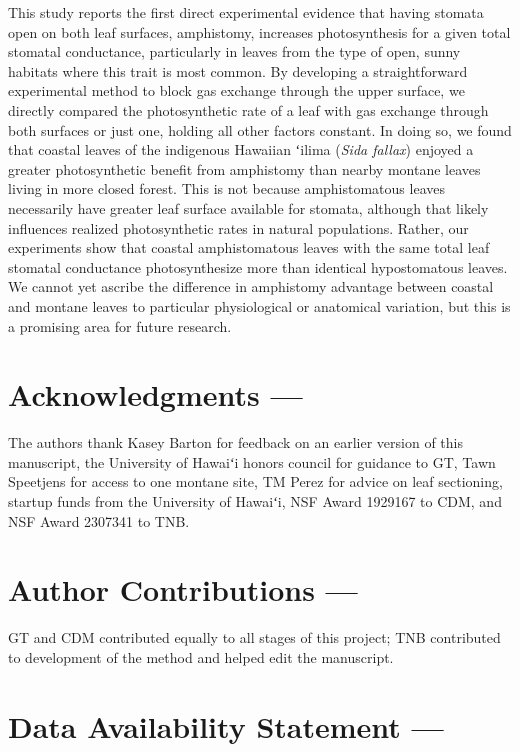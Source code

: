 \documentclass[
  letterpaper,
  DIV=11,
  numbers=noendperiod]{scrartcl}
\begin{document}
This study reports the first direct experimental evidence that having
stomata open on both leaf surfaces, amphistomy, increases photosynthesis
for a given total stomatal conductance, particularly in leaves from the
type of open, sunny habitats where this trait is most common. By
developing a straightforward experimental method to block gas exchange
through the upper surface, we directly compared the photosynthetic rate
of a leaf with gas exchange through both surfaces or just one, holding
all other factors constant. In doing so, we found that coastal leaves of
the indigenous Hawaiian ʻilima (\emph{Sida fallax}) enjoyed a greater
photosynthetic benefit from amphistomy than nearby montane leaves living
in more closed forest. This is not because amphistomatous leaves
necessarily have greater leaf surface available for stomata, although
that likely influences realized photosynthetic rates in natural
populations. Rather, our experiments show that coastal amphistomatous
leaves with the same total leaf stomatal conductance photosynthesize
more than identical hypostomatous leaves. We cannot yet ascribe the
difference in amphistomy advantage between coastal and montane leaves to
particular physiological or anatomical variation, but this is a
promising area for future research.

\hypertarget{acknowledgments}{%
\section{Acknowledgments ---}\label{acknowledgments}}

The authors thank Kasey Barton for feedback on an earlier version of
this manuscript, the University of Hawaiʻi honors council for guidance
to GT, Tawn Speetjens for access to one montane site, TM Perez for
advice on leaf sectioning, startup funds from the University of Hawaiʻi,
NSF Award 1929167 to CDM, and NSF Award 2307341 to TNB.

\hypertarget{author-ontributions}{%
\section{Author Contributions ---}\label{author-ontributions}}

GT and CDM contributed equally to all stages of this project; TNB
contributed to development of the method and helped edit the manuscript.

\hypertarget{data-availability-statement}{%
\section{Data Availability Statement
---}\label{data-availability-statement}}
\end{document}
